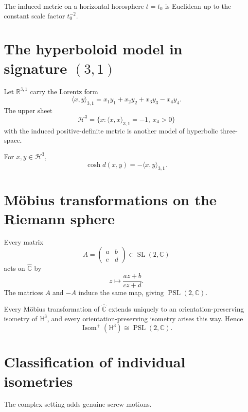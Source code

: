 \begin{remark}
The induced metric on a horizontal horosphere \(t=t_0\) is Euclidean up to the constant scale factor \(t_0^{-2}\).
\end{remark}


\section{The hyperboloid model in signature \((3,1)\)}

Let \(\mathbb R^{3,1}\) carry the Lorentz form
\[
\langle x,y\rangle_{3,1}=x_1y_1+x_2y_2+x_3y_3-x_4y_4.
\]
The upper sheet
\[
\mathcal H^3=\{x:\langle x,x\rangle_{3,1}=-1,\ x_4>0\}
\]
with the induced positive-definite metric is another model of hyperbolic three-space.

\begin{theorem}\label{thm:vii36-lorentz-distance}
For \(x,y\in\mathcal H^3\),
\[
\cosh d(x,y)=-\langle x,y\rangle_{3,1}.
\]
\end{theorem}


\section{Möbius transformations on the Riemann sphere}

Every matrix
\[
A=\begin{pmatrix}a&b\\ c&d\end{pmatrix}\in\operatorname{SL}(2,\mathbb C)
\]
acts on \(\widehat{\mathbb C}\) by
\[
z\longmapsto\frac{az+b}{cz+d}.
\]
The matrices \(A\) and \(-A\) induce the same map, giving \(\operatorname{PSL}(2,\mathbb C)\).

\begin{theorem}\label{thm:vii36-extension}
Every Möbius transformation of \(\widehat{\mathbb C}\) extends uniquely to an orientation-preserving isometry of \(\mathbb H^3\), and every orientation-preserving isometry arises this way.  Hence
\[
\operatorname{Isom}^+(\mathbb H^3)\cong\operatorname{PSL}(2,\mathbb C).
\]
\end{theorem}


\section{Classification of individual isometries}

The complex setting adds genuine screw motions.

